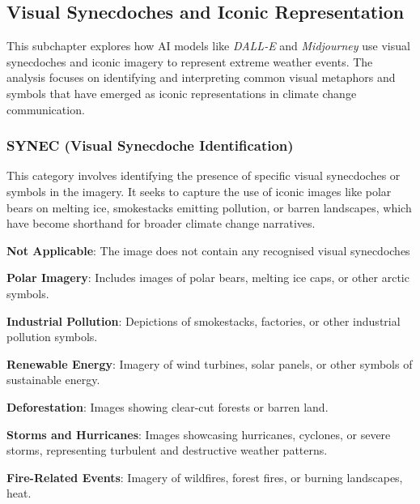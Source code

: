 \subsection{Visual Synecdoches and Iconic Representation}
\label{subsec:visual-synecdoches}

This subchapter explores how AI models like \textit{DALL-E} and \textit{Midjourney} use visual synecdoches and iconic imagery to represent extreme weather events. The analysis focuses on identifying and interpreting common visual metaphors and symbols that have emerged as iconic representations in climate change communication.

\subsubsection*{SYNEC (Visual Synecdoche Identification)}
\label{subsubsec:synec}
This category involves identifying the presence of specific visual synecdoches or symbols in the imagery. It seeks to capture the use of iconic images like polar bears on melting ice, smokestacks emitting pollution, or barren landscapes, which have become shorthand for broader climate change narratives.

\begin{description}[leftmargin=2.5cm, style=multiline, labelwidth=1.5cm]
\item[0] \textbf{Not Applicable}: The image does not contain any recognised visual synecdoches
\item[1] \textbf{Polar Imagery}: Includes images of polar bears, melting ice caps, or other arctic symbols.
\item[2] \textbf{Industrial Pollution}: Depictions of smokestacks, factories, or other industrial pollution symbols.
\item[3] \textbf{Renewable Energy}: Imagery of wind turbines, solar panels, or other symbols of sustainable energy.
\item[4] \textbf{Deforestation}: Images showing clear-cut forests or barren land.
\item[5] \textbf{Storms and Hurricanes}: Images showcasing hurricanes, cyclones, or severe storms, representing turbulent and destructive weather patterns.
\item[6] \textbf{Fire-Related Events}: Imagery of wildfires, forest fires, or burning landscapes, heat.
\end{description}